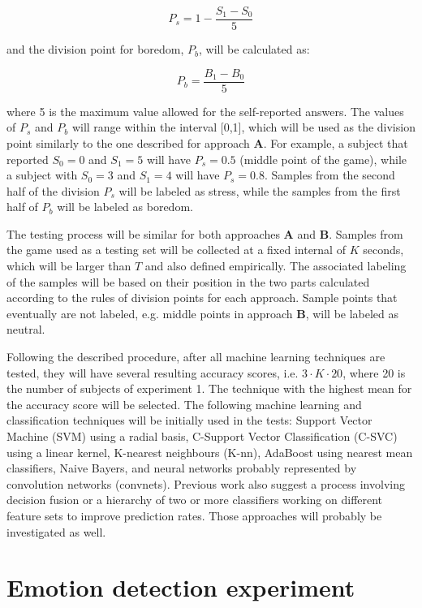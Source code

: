\begin{equation}
P_s = 1 - \frac{S_1 - S_0}{5}
\end{equation}

and the division point for boredom, $P_b$, will be calculated as:

\begin{equation}
P_b = \frac{B_1 - B_0}{5}
\end{equation}

where 5 is the maximum value allowed for the self-reported answers. The values of $P_s$ and $P_b$ will range within the interval [0,1], which will be used as the division point similarly to the one described for approach \textbf{A}. For example, a subject that reported $S_0=0$ and $S_1=5$ will have $P_s=0.5$ (middle point of the game), while a subject with $S_0=3$ and $S_1=4$ will have $P_s=0.8$. Samples from the second half of the division $P_s$ will be labeled as stress, while the samples from the first half of $P_b$ will be labeled as boredom.

The testing process will be similar for both approaches \textbf{A} and \textbf{B}. Samples from the game used as a testing set will be collected at a fixed internal of $K$ seconds, which will be larger than $T$ and also defined empirically. The associated labeling of the samples will be based on their position in the two parts calculated according to the rules of division points for each approach. Sample points that eventually are not labeled, e.g. middle points in approach \textbf{B}, will be labeled as neutral.

Following the described procedure, after all machine learning techniques are tested, they will have several resulting accuracy scores, i.e. $3 \cdot K \cdot 20$, where 20 is the number of subjects of experiment 1. The technique with the highest mean for the accuracy score will be selected. The following machine learning and classification techniques will be initially used in the tests: Support Vector Machine (SVM) using a radial basis, C-Support Vector Classification (C-SVC) using a linear kernel, K-nearest neighbours (K-nn), AdaBoost using nearest mean classifiers, Naive Bayers, and neural networks probably represented by convolution networks (convnets). Previous work also suggest a process involving decision fusion or a hierarchy of two or more classifiers working on different feature sets to improve prediction rates. Those approaches will probably be investigated as well.

\section{Emotion detection experiment}
\label{closing:emotion-detection-experiment}

